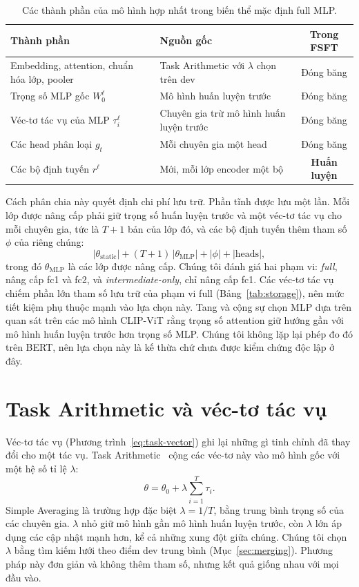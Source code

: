 \begin{table}[htbp]
  \centering\tablestyle
  \caption{Các thành phần của mô hình hợp nhất trong biến thể mặc định full MLP.}
  \label{tab:components}
  \begin{tabularx}{\linewidth}{l X c}
    \toprule
    Thành phần & Nguồn gốc & Trong FSFT\\
    \midrule
    Embedding, attention, chuẩn hóa lớp, pooler & Task Arithmetic với $\lambda$ chọn trên dev & Đóng băng\\
    Trọng số MLP gốc $W_0^{\ell}$ & Mô hình huấn luyện trước & Đóng băng\\
    Véc-tơ tác vụ của MLP $\tau_i^{\ell}$ & Chuyên gia trừ mô hình huấn luyện trước & Đóng băng\\
    Các head phân loại $g_t$ & Mỗi chuyên gia một head & Đóng băng\\
    Các bộ định tuyến $r^{\ell}$ & Mới, mỗi lớp encoder một bộ & \textbf{Huấn luyện}\\
    \bottomrule
  \end{tabularx}
\end{table}

Cách phân chia này quyết định chi phí lưu trữ. Phần tĩnh được lưu một lần. Mỗi lớp được nâng cấp phải giữ trọng số huấn luyện trước và một véc-tơ tác vụ cho mỗi chuyên gia, tức là $T+1$ bản của lớp đó, và các bộ định tuyến thêm tham số $\phi$ của riêng chúng:
\begin{equation}
|\theta_{\mathrm{static}}|+(T+1)\,|\theta_{\mathrm{MLP}}|+|\phi|+|\mathrm{heads}|,
\label{eq:storage}
\end{equation}
trong đó $\theta_{\mathrm{MLP}}$ là các lớp được nâng cấp. Chúng tôi đánh giá hai phạm vi: \emph{full}, nâng cấp fc1 và fc2, và \emph{intermediate-only}, chỉ nâng cấp fc1. Các véc-tơ tác vụ chiếm phần lớn tham số lưu trữ của phạm vi full (Bảng~\ref{tab:storage}), nên mức tiết kiệm phụ thuộc mạnh vào lựa chọn này. Tang và cộng sự chọn MLP dựa trên quan sát trên các mô hình CLIP-ViT rằng trọng số attention giữ hướng gần với mô hình huấn luyện trước hơn trọng số MLP. Chúng tôi không lặp lại phép đo đó trên BERT, nên lựa chọn này là kế thừa chứ chưa được kiểm chứng độc lập ở đây.

\section{Task Arithmetic và véc-tơ tác vụ}
\label{sec:ta}

Véc-tơ tác vụ (Phương trình~\ref{eq:task-vector}) ghi lại những gì tinh chỉnh đã thay đổi cho một tác vụ. Task Arithmetic~\cite{ilharco2023task} cộng các véc-tơ này vào mô hình gốc với một hệ số tỉ lệ $\lambda$:
\begin{equation}
\theta=\theta_0+\lambda\sum_{i=1}^{T}\tau_i .
\label{eq:ta}
\end{equation}
Simple Averaging là trường hợp đặc biệt $\lambda=1/T$, bằng trung bình trọng số của các chuyên gia. $\lambda$ nhỏ giữ mô hình gần mô hình huấn luyện trước, còn $\lambda$ lớn áp dụng các cập nhật mạnh hơn, kể cả những xung đột giữa chúng. Chúng tôi chọn $\lambda$ bằng tìm kiếm lưới theo điểm dev trung bình (Mục~\ref{sec:merging}). Phương pháp này đơn giản và không thêm tham số, nhưng kết quả giống nhau với mọi đầu vào.

